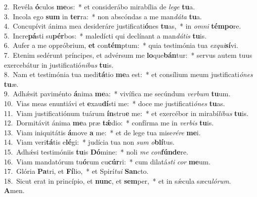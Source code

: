 {2.~}Revéla \textbf{ó}culos \textbf{me}os:~* et considerábo mirabília de \textit{le}\textit{ge} \textbf{tu}a.\\
{3.~}Incola ego \textbf{sum} in \textbf{ter}ra:~* non abscóndas a me man\textit{dá}\textit{ta} \textbf{tu}a.\\
{4.~}Concupívit ánima mea desideráre justificati\textbf{ó}nes \textbf{tu}as,~* in \textit{om}\textit{ni} \textbf{tém}\textbf{po}re.\\
{5.~}Incre\textbf{pá}sti su\textbf{pér}bos:~* maledícti qui declínant a man\textit{dá}\textit{tis} \textbf{tu}is.\\
{6.~}Aufer a me oppróbrium, \textbf{et} con\textbf{tém}ptum:~* quia testimónia tua \textit{ex}\textit{qui}\textbf{sí}vi.\\
{7.~}Etenim sedérunt príncipes, et advérsum me \textbf{lo}que\textbf{bán}tur:~* servus autem tuus exercebátur in justificatió\textit{ni}\textit{bus} \textbf{tu}is.\\
{8.~}Nam et testimónia tua medi\textbf{tá}tio \textbf{me}a est:~* et consílium meum justificati\textit{ó}\textit{nes} \textbf{tu}æ.\\
{9.~}Adhǽsit paviménto \textbf{á}nima \textbf{me}a:~* vivífica me secúndum \textit{ver}\textit{bum} \textbf{tu}um.\\
{10.~}Vias meas enuntiávi et \textbf{e}xau\textbf{dí}sti me:~* doce me justificati\textit{ó}\textit{nes} \textbf{tu}as.\\
{11.~}Viam justificatiónum tuárum \textbf{ín}stru\textbf{e} me:~* et exercébor in mirabí\textit{li}\textit{bus} \textbf{tu}is.\\
{12.~}Dormitávit ánima \textbf{me}a præ \textbf{tǽ}dio:~* confírma me in \textit{ver}\textit{bis} \textbf{tu}is.\\
{13.~}Viam iniquitátis \textbf{á}move \textbf{a} me:~* et de lege tua mise\textit{ré}\textit{re} \textbf{me}i.\\
{14.~}Viam veri\textbf{tá}tis e\textbf{lé}gi:~* judícia tua non \textit{sum} \textit{o}\textbf{blí}tus.\\
{15.~}Adhǽsi testimóniis \textbf{tu}is \textbf{Dó}mine:~* noli \textit{me} \textit{con}\textbf{fún}\textbf{de}re.\\
{16.~}Viam mandatórum tu\textbf{ó}rum cu\textbf{cúr}ri:~* cum dilatá\textit{sti} \textit{cor} \textbf{me}um.\\
{17.~}Glória \textbf{Pa}tri, et \textbf{Fí}lio,~* et Spirí\textit{tu}\textit{i} \textbf{San}cto.\\
{18.~}Sicut erat in princípio, et \textbf{nunc}, et \textbf{sem}per,~* et in sǽcula sæcu\textit{ló}\textit{rum}. \textbf{A}men.\\
